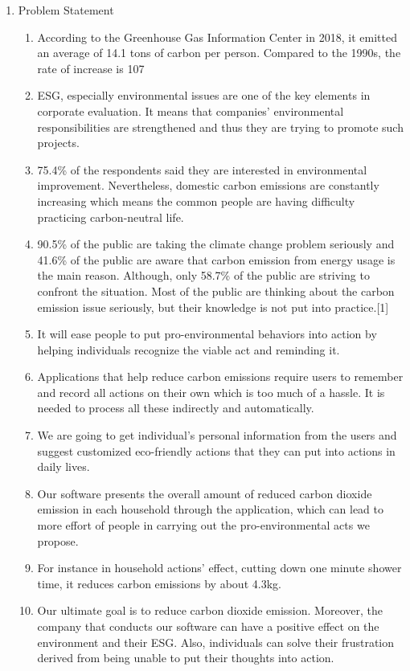 \documentclass[11pt, conference]{IEEEtran}
\begin{document}
\begin{enumerate}[label=\arabic*]
    \item {\large{Problem Statement}}
        \begin{enumerate}[label=\alph*]
            \item According to the Greenhouse Gas Information Center in 2018, it emitted an average of 14.1 tons of carbon per person. Compared to the 1990s, the rate of increase is 107%
            \item ESG, especially environmental issues are one of the key elements in corporate evaluation. It means that companies’ environmental responsibilities are strengthened and thus they are trying to promote such projects.
            \item 75.4\% of the respondents said they are interested in environmental improvement. Nevertheless, domestic carbon emissions are constantly increasing which means the common people are having difficulty practicing carbon-neutral life.
            \item 90.5\% of the public are taking the climate change problem seriously and 41.6\% of the public are aware that carbon emission from energy usage is the main reason. Although, only 58.7\% of the public are striving to confront the situation. Most of the public are thinking about the carbon emission issue seriously, but their knowledge is not put into practice.[1]
            \item It will ease people to put pro-environmental behaviors into action by helping individuals recognize the viable act and reminding it.
            \item Applications that help reduce carbon emissions require users to remember and record all actions on their own which is too much of a hassle. It is needed to process all these indirectly and automatically.
            \item We are going to get individual’s personal information from the users and suggest customized eco-friendly actions that they can put into actions in daily lives.
            \item Our software presents the overall amount of reduced carbon dioxide emission in each household through the application, which can lead to more effort of people in carrying out the pro-environmental acts we propose.
            \item For instance in household actions’ effect, cutting down one minute shower time, it reduces carbon emissions by about 4.3kg.
            \item Our ultimate goal is to reduce carbon dioxide emission. Moreover, the company that conducts our software can have a positive effect on the environment and their ESG. Also, individuals can solve their frustration derived from being unable to put their thoughts into action.\\
        \end{enumerate}
        

\end{enumerate}
\end{document}
